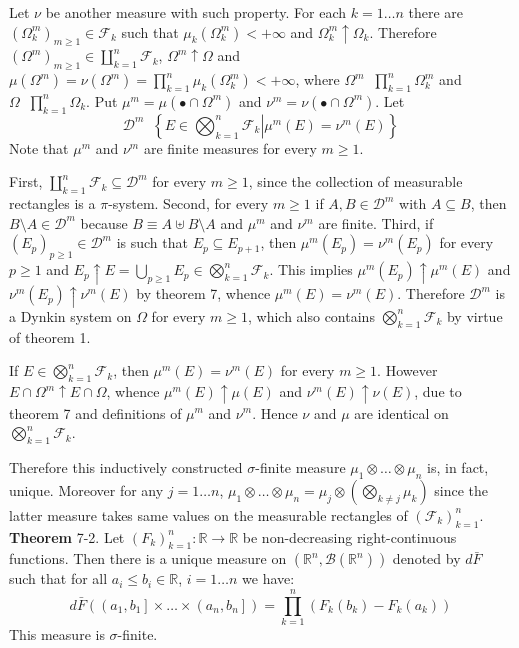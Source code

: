 \documentclass[a4paper]{article}
\newcommand{\obj}[1]{\left\{ #1 \right \}}
\newcommand{\ploc}[1]{\left ( #1 \right ]}
\newcommand{\brac}[1]{\left ( #1 \right )}
\newcommand{\induc}[1]{\left . #1 \right \vert}
\newcommand{\Real}{\mathbb{R}}
\newcommand{\Dcal}{\mathcal{D}}
\newcommand{\Fcal}{\mathcal{F}}
\newcommand{\borel}[1]{\mathcal{B}\brac{#1}}
\newcommand{\defn}{\mathop{\overset{\Delta}{=}}\nolimits}
\begin{document}
Let $\nu$ be another measure with such property. For each $k=1\ldots n$ there are $\brac{\Omega_k^m}_{m\geq 1}\in \Fcal_k$ such that $\mu_k\brac{\Omega_k^m}<+\infty$ and $\Omega_k^m\uparrow \Omega_k$. Therefore $\brac{\Omega^m}_{m\geq1} \in \coprod_{k=1}^n\Fcal_k$, $\Omega^m\uparrow \Omega$ and $\mu\brac{\Omega^m} = \nu\brac{\Omega^m} = \prod_{k=1}^n \mu_k\brac{\Omega_k^m}<+\infty$, where $\Omega^m \defn \prod_{k=1}^n \Omega_k^m$ and $\Omega \defn \prod_{k=1}^n \Omega_k$. Put $\mu^m = \mu\brac{ \bullet \cap \Omega^m }$ and $\nu^m = \nu\brac{ \bullet \cap \Omega^m }$. Let \[\Dcal^m\defn \obj{ \induc{ E\in \bigotimes_{k=1}^n \Fcal_k } \mu^m\brac{E} = \nu^m\brac{E} }\] Note that $\mu^m$ and $\nu^m$ are finite measures for every $m\geq 1$.

First, $\coprod_{k=1}^n \Fcal_k \subseteq \Dcal^m$ for every $m\geq 1$, since the collection of measurable rectangles is a $\pi$-system. Second,  for every $m\geq 1$ if $A,B \in \Dcal^m$ with $A\subseteq B$, then $B\setminus A \in \Dcal^m$ because $B \equiv A\uplus B\setminus A$ and $\mu^m$ and $\nu^m$ are finite. Third, if $\brac{E_p}_{p\geq 1}\in \Dcal^m$ is such that $E_p\subseteq E_{p+1}$, then $\mu^m\brac{E_p} = \nu^m\brac{E_p}$ for every $p\geq 1$ and $E_p\uparrow E = \bigcup_{p\geq 1} E_p \in \bigotimes_{k=1}^n \Fcal_k$. This implies $\mu^m\brac{E_p}\uparrow\mu^m\brac{E}$ and $\nu^m\brac{E_p}\uparrow\nu^m\brac{E}$ by theorem 7, whence $\mu^m\brac{E} = \nu^m\brac{E}$. Therefore $\Dcal^m$ is a Dynkin system on $\Omega$ for every $m\geq 1$, which also contains $\bigotimes_{k=1}^n \Fcal_k$ by virtue of theorem 1.

If $E\in \bigotimes_{k=1}^n \Fcal_k$, then $\mu^m\brac{E} = \nu^m\brac{E}$ for every $m\geq 1$. However $E\cap \Omega^m\uparrow E\cap \Omega$, whence $\mu^m\brac{E} \uparrow \mu\brac{E}$ and $\nu^m\brac{E} \uparrow \nu\brac{E}$, due to theorem 7 and definitions of $\mu^m$ and $\nu^m$. Hence $\nu$ and $\mu$ are identical on $\bigotimes_{k=1}^n \Fcal_k$.

Therefore this inductively constructed $\sigma$-finite measure $\mu_1\otimes\ldots\otimes\mu_n$ is, in fact, unique. Moreover for any $j=1\ldots n$, $\mu_1\otimes\ldots\otimes\mu_n = \mu_j\otimes\brac{\bigotimes_{k\neq j} \mu_k}$ since the latter measure takes same values on the measurable rectangles of $\brac{\Fcal_k}_{k=1}^n$.\\

\label{thm:lebesgue_stieltjes_prod_meas} \noindent \textbf{Theorem} 7-2.
Let $\brac{F_k}_{k=1}^n:\Real\to \Real$ be non-decreasing right-continuous functions. Then there is a unique measure on $\brac{\Real^n, \borel{\Real^n}}$ denoted by $d\bar{F}$ such that for all $a_i\leq b_i\in \Real$, $i=1\ldots n$ we have:\[d\bar{F}\brac{ \ploc{a_1, b_1}\times \ldots \times \ploc{a_n, b_n} } = \prod_{k=1}^n \brac{ F_k\brac{b_k} - F_k\brac{a_k} }\] This measure is $\sigma$-finite.
\end{document}
